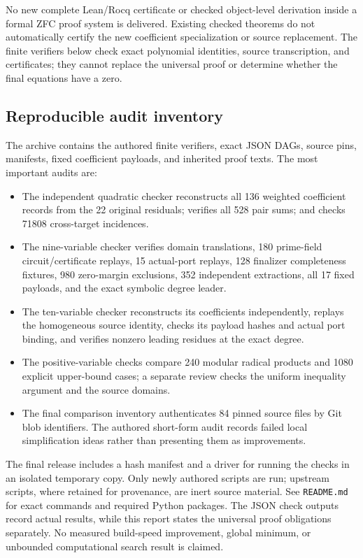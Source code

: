 \documentclass[11pt]{article}
\begin{document}
No new complete Lean/Rocq certificate or checked object-level derivation
inside a formal ZFC proof system is delivered. Existing checked theorems do
not automatically certify the new coefficient specialization or source
replacement. The finite verifiers below check exact polynomial identities,
source transcription, and certificates; they cannot replace the universal
proof or determine whether the final equations have a zero.

\subsection{Reproducible audit inventory}
The archive contains the authored finite verifiers, exact JSON DAGs, source
pins, manifests, fixed coefficient payloads, and inherited proof texts.
The most important audits are:
\begin{itemize}
\item The independent quadratic checker reconstructs all 136 weighted
coefficient records from the 22 original residuals; verifies all 528 pair
sums; and checks 71808 cross-target incidences.
\item The nine-variable checker verifies domain translations, 180
prime-field circuit/certificate replays, 15 actual-port replays, 128
finalizer completeness fixtures, 980 zero-margin exclusions, 352 independent
extractions, all 17 fixed payloads, and the exact symbolic degree leader.
\item The ten-variable checker reconstructs its coefficients independently,
replays the homogeneous source identity, checks its payload hashes and actual
port binding, and verifies nonzero leading residues at the exact degree.
\item The positive-variable checks compare 240 modular radical products and
1080 explicit upper-bound cases; a separate review checks the uniform
inequality argument and the source domains.
\item The final comparison inventory authenticates 84 pinned source files by
Git blob identifiers. The authored short-form audit records failed local
simplification ideas rather than presenting them as improvements.
\end{itemize}
The final release includes a hash manifest and a driver for running the
checks in an isolated temporary copy. Only newly authored scripts are run;
upstream scripts, where retained for provenance, are inert source material.
See \texttt{README.md} for exact commands and required Python packages.
The JSON check outputs record actual results, while this report states the
universal proof obligations separately. No measured build-speed improvement,
global minimum, or unbounded computational search result is claimed.
\end{document}
